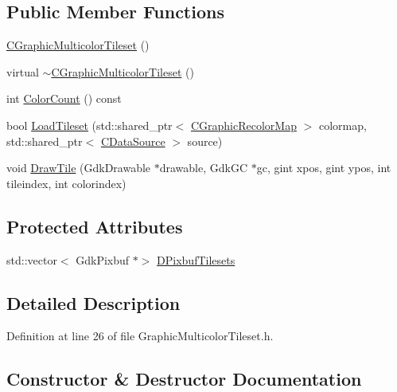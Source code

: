 \subsection*{Public Member Functions}
\begin{DoxyCompactItemize}
\item 
\hyperlink{classCGraphicMulticolorTileset_ab91793ba1d14579e979db7e2fcd80199}{C\+Graphic\+Multicolor\+Tileset} ()
\item 
virtual \hyperlink{classCGraphicMulticolorTileset_aa454897de796ad7048f6bb64fdd5311e}{$\sim$\+C\+Graphic\+Multicolor\+Tileset} ()
\item 
int \hyperlink{classCGraphicMulticolorTileset_abde63a1cef8d3eaeafe5c86f31ab9cae}{Color\+Count} () const
\item 
bool \hyperlink{classCGraphicMulticolorTileset_a6ab975d5bc2ba0ed892de03bba9242cc}{Load\+Tileset} (std\+::shared\+\_\+ptr$<$ \hyperlink{classCGraphicRecolorMap}{C\+Graphic\+Recolor\+Map} $>$ colormap, std\+::shared\+\_\+ptr$<$ \hyperlink{classCDataSource}{C\+Data\+Source} $>$ source)
\item 
void \hyperlink{classCGraphicMulticolorTileset_a17ee648ac82c48079a1853dc8a10365a}{Draw\+Tile} (Gdk\+Drawable $\ast$drawable, Gdk\+GC $\ast$gc, gint xpos, gint ypos, int tileindex, int colorindex)
\end{DoxyCompactItemize}
\subsection*{Protected Attributes}
\begin{DoxyCompactItemize}
\item 
std\+::vector$<$ Gdk\+Pixbuf $\ast$$>$ \hyperlink{classCGraphicMulticolorTileset_a30809d113b0f314944425a3c8f21408c}{D\+Pixbuf\+Tilesets}
\end{DoxyCompactItemize}


\subsection{Detailed Description}


Definition at line 26 of file Graphic\+Multicolor\+Tileset.\+h.



\subsection{Constructor \& Destructor Documentation}
\hypertarget{classCGraphicMulticolorTileset_ab91793ba1d14579e979db7e2fcd80199}{}\label{classCGraphicMulticolorTileset_ab91793ba1d14579e979db7e2fcd80199} 
